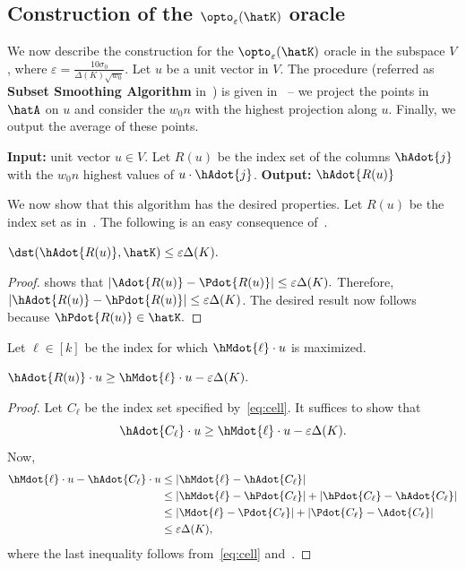 \subsection{Construction of the $\opto_\varepsilon(\hatK)$ oracle}

We now describe the construction for the   $\opto_\varepsilon(\hatK)$ oracle in the subspace $V$, where $\varepsilon = \frac{10 \sigma_0}{\Delta(K) \sqrt{w_0}}$. Let $u$ be a unit vector in $V$. The procedure (referred as {\bf Subset Smoothing Algorithm} in~) is given in~  -- we project the points in $\hatA$ on $u$ and consider the  $w_0 n$ with the highest projection along $u$. Finally, we output the average of these points. 



\begin{algorithm}[H]
  \caption{Orcale in $\opto_\varepsilon(\hatK)$}
  \label{algo:center}
    {\bf Input:} unit vector $u \in V$. \;
       Let $R(u)$ be the index set of the columns $\hAdot{j}$ with the $w_0 n$ highest values of $u \cdot \hAdot{j}$. \;
      {\bf Output:} $\hAdot{R(u)}$ \;
\end{algorithm}


We now show that this algorithm has the desired properties. Let $R(u)$ be the index set as in~. The following is an easy consequence of~. 
\begin{claim}
\label{cl:eps1}
    $\dst(\hAdot{R(u)}, \hatK) \leq \varepsilon\Delta(K) . $
\end{claim}
\begin{proof}
     shows that $|\Adot{R(u)} - \Pdot{R(u)}| \leq \varepsilon\Delta(K) .$ Therefore, 
    $|\hAdot{R(u)} - \hPdot{R(u)}| \leq \varepsilon\Delta(K) $. The desired result now follows because
    $\hPdot{R(u)} \in \hatK.$
\end{proof}


Let $\ell \in [k]$ be the index for which $\hMdot{\ell} \cdot u$ is maximized. 
\begin{claim}
    \label{cl:eps2}
    $\hAdot{R(u)} \cdot u \geq \hMdot{\ell} \cdot u - \varepsilon\Delta(K) .$
\end{claim}
\begin{proof}
    Let $C_\ell$ be the index set specified by~\eqref{eq:cell}. It suffices to show that 
    $$ \hAdot{C_\ell} \cdot u \geq \hMdot{\ell} \cdot u - \varepsilon\Delta(K) .$$ 
    Now, 
    \begin{align*}
    \hMdot{\ell} \cdot u - \hAdot{C_\ell} \cdot u & \leq |\hMdot{\ell} - \hAdot{C_\ell}| \\
    & \leq |\hMdot{\ell} - \hPdot{C_\ell}| + |\hPdot{C_\ell} - \hAdot{C_\ell}| \\
    & \leq |\Mdot{\ell} - \Pdot{C_\ell}| + |\Pdot{C_\ell} - \Adot{C_\ell}| \\
    & \leq \varepsilon \Delta(K),
    \end{align*}
where the last inequality follows from~\eqref{eq:cell} and~. 
\end{proof}

